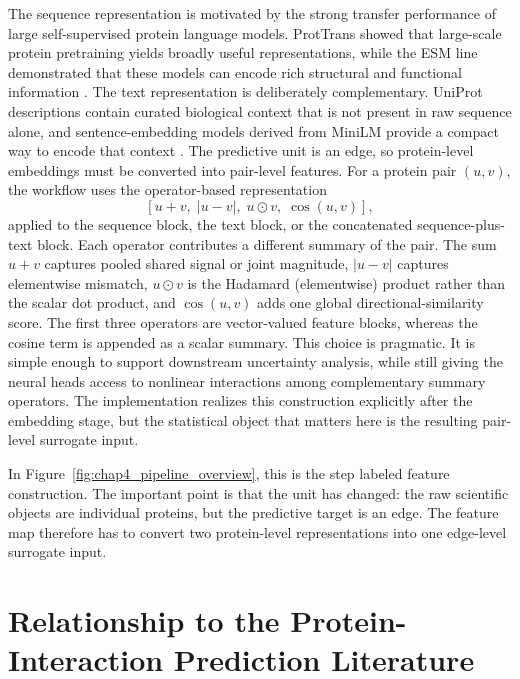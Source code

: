 The sequence representation is motivated by the strong transfer performance of large self-supervised protein language models. ProtTrans showed that large-scale protein pretraining yields broadly useful representations, while the ESM line demonstrated that these models can encode rich structural and functional information \parencite{prottrans2022, lin2023}. The text representation is deliberately complementary. UniProt descriptions contain curated biological context that is not present in raw sequence alone, and sentence-embedding models derived from MiniLM provide a compact way to encode that context \parencite{minilm2020, reimers-2021-all-minilm-l6-v2, uniprot2025}.
The predictive unit is an edge, so protein-level embeddings must be converted into pair-level features. For a protein pair $(u,v)$, the workflow uses the operator-based representation
\[
[u+v,\; |u-v|,\; u \odot v,\; \cos(u,v)],
\]
applied to the sequence block, the text block, or the concatenated sequence-plus-text block. Each operator contributes a different summary of the pair. The sum \(u+v\) captures pooled shared signal or joint magnitude, \(|u-v|\) captures elementwise mismatch, \(u \odot v\) is the Hadamard (elementwise) product rather than the scalar dot product, and \(\cos(u,v)\) adds one global directional-similarity score. The first three operators are vector-valued feature blocks, whereas the cosine term is appended as a scalar summary. This choice is pragmatic. It is simple enough to support downstream uncertainty analysis, while still giving the neural heads access to nonlinear interactions among complementary summary operators. The implementation realizes this construction explicitly after the embedding stage, but the statistical object that matters here is the resulting pair-level surrogate input.

In Figure~\ref{fig:chap4_pipeline_overview}, this is the step labeled feature construction. The important point is that the unit has changed: the raw scientific objects are individual proteins, but the predictive target is an edge. The feature map therefore has to convert two protein-level representations into one edge-level surrogate input.

\section[Protein-Interaction Prediction Literature]{Relationship to the Protein-Interaction Prediction Literature}

